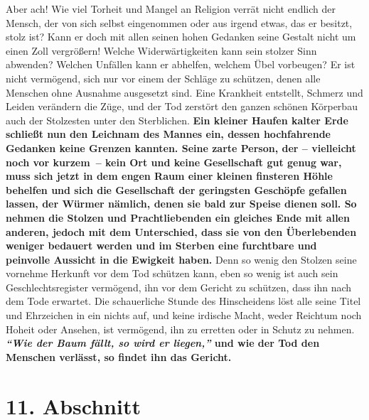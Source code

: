 Aber ach! Wie viel Torheit und Mangel an Religion verrät nicht endlich der
Mensch, der von sich selbst eingenommen oder aus irgend etwas, das er besitzt,
stolz ist? Kann er doch mit allen seinen hohen Gedanken seine Gestalt nicht um
einen Zoll vergrößern! Welche Widerwärtigkeiten kann sein stolzer Sinn abwenden?
Welchen Unfällen kann er abhelfen, welchem Übel vorbeugen? Er ist nicht
vermögend, sich nur vor einem der Schläge zu schützen, denen alle Menschen ohne
Ausnahme ausgesetzt sind.
Eine Krankheit entstellt,
Schmerz und Leiden
verändern die Züge, und der Tod zerstört den ganzen schönen Körperbau auch der
Stolzesten unter den Sterblichen.
\label{ref:12_10_eitle_menschen_tod}
\textbf{Ein kleiner Haufen kalter Erde schließt nun
den Leichnam des Mannes ein, dessen hochfahrende Gedanken keine Grenzen kannten.
Seine zarte Person, der -- vielleicht noch vor kurzem~-- kein Ort und keine
Gesellschaft gut genug war, muss sich jetzt in dem engen Raum einer kleinen
finsteren Höhle behelfen und sich die Gesellschaft der geringsten Geschöpfe
gefallen lassen, der Würmer nämlich, denen sie bald zur Speise dienen soll. So
nehmen die Stolzen und Prachtliebenden ein gleiches Ende mit allen anderen,
jedoch mit dem Unterschied, dass sie von den Überlebenden weniger
bedauert
werden und im Sterben eine furchtbare und peinvolle Aussicht in die Ewigkeit
haben.} Denn so wenig den Stolzen seine vornehme Herkunft vor dem Tod schützen
kann, eben so wenig ist auch sein Geschlechtsregister vermögend, ihn vor dem
Gericht zu schützen, dass ihn nach dem Tode erwartet. Die schauerliche Stunde
des Hinscheidens löst alle seine Titel und Ehrzeichen in ein nichts auf, und
keine irdische Macht, weder Reichtum noch Hoheit oder Ansehen, ist vermögend,
ihn zu erretten oder in Schutz zu nehmen. \textbf{\textit{"`Wie der Baum fällt,
so wird er
liegen,"'} und wie der Tod den Menschen verlässt, so findet ihn das Gericht.}

\section{11. Abschnitt} \label{kap12_ab11}

